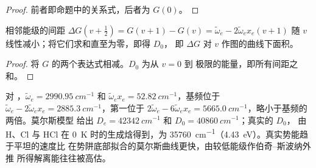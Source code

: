 \begin{proof}
前者即命题中的关系式，后者为 $G(0)$。
\end{proof}

\begin{proposition}[伯奇–斯波纳外推法]\label{prop:b3:rovibrational-spectroscopy:birge-sponer}
相邻能级的间距 $\Delta G(v + \frac12) = G(v+1) - G(v) = \tilde\omega_e - 2\tilde\omega_ex_e(v +
1)$ 随 $v$ 线性减小；将它们求和直至为零，即得 $D_0$，
即 $\Delta G$ 对 $v$ 作图的曲线下面积。
\end{proposition}

\begin{proof}
将 $G$ 的两个表达式相减。$D_0$ 为从 $v = 0$ 到
极限的能量，即所有间距之和。
\end{proof}

\begin{example}[氯化氢]\label{ex:b3:rovibrational-spectroscopy:hcl}
对 ，$\tilde\omega_e = \qty{2990.95}{cm^{-1}}$ 和 $\tilde\omega_ex_e =
\qty{52.82}{cm^{-1}}$，基频位于 $\tilde\omega_e - 2\tilde\omega_ex_e =
\qty{2885.3}{cm^{-1}}$，第一位于 $2\tilde\omega_e - 6\tilde\omega_ex_e =
\qty{5665.0}{cm^{-1}}$，略小于基频的两倍。莫尔斯模型
给出 $D_e = \qty{42342}{cm^{-1}}$ 和 $D_0 = \qty{40860}{cm^{-1}}$；真实的 $D_0$，
由 H、Cl 与 HCl 在 \qty{0}{K} 时的生成焓得到，为
\qty{35760}{cm^{-1}}（\qty{4.43}{eV}）。真实势能趋于平坦的速度比
在势阱底部拟合的莫尔斯曲线更快，由较低能级作伯奇–斯波纳外推
所得解离能往往被高估。
\end{example}


